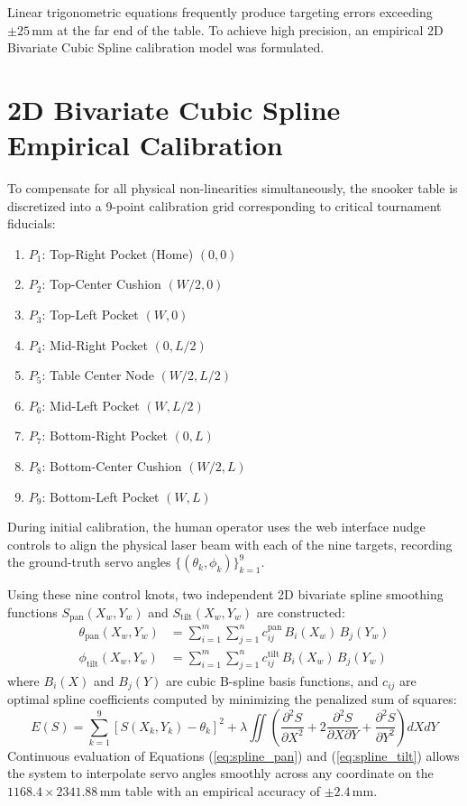 Linear trigonometric equations frequently produce targeting errors exceeding $\pm 25\,\text{mm}$ at the far end of the table. To achieve high precision, an empirical 2D Bivariate Cubic Spline calibration model was formulated.

\section{2D Bivariate Cubic Spline Empirical Calibration}
To compensate for all physical non-linearities simultaneously, the snooker table is discretized into a 9-point calibration grid corresponding to critical tournament fiducials:
\begin{enumerate}
    \item $P_1$: Top-Right Pocket (Home) $(0, 0)$
    \item $P_2$: Top-Center Cushion $(W/2, 0)$
    \item $P_3$: Top-Left Pocket $(W, 0)$
    \item $P_4$: Mid-Right Pocket $(0, L/2)$
    \item $P_5$: Table Center Node $(W/2, L/2)$
    \item $P_6$: Mid-Left Pocket $(W, L/2)$
    \item $P_7$: Bottom-Right Pocket $(0, L)$
    \item $P_8$: Bottom-Center Cushion $(W/2, L)$
    \item $P_9$: Bottom-Left Pocket $(W, L)$
\end{enumerate}

During initial calibration, the human operator uses the web interface nudge controls to align the physical laser beam with each of the nine targets, recording the ground-truth servo angles $\{ (\theta_k, \phi_k) \}_{k=1}^9$. 

Using these nine control knots, two independent 2D bivariate spline smoothing functions $S_{\text{pan}}(X_w, Y_w)$ and $S_{\text{tilt}}(X_w, Y_w)$ are constructed:
\begin{align}
    \theta_{\text{pan}}(X_w, Y_w) &= \sum_{i=1}^m \sum_{j=1}^n c_{ij}^{\text{pan}} \, B_i(X_w) \, B_j(Y_w) \label{eq:spline_pan} \\
    \phi_{\text{tilt}}(X_w, Y_w) &= \sum_{i=1}^m \sum_{j=1}^n c_{ij}^{\text{tilt}} \, B_i(X_w) \, B_j(Y_w) \label{eq:spline_tilt}
\end{align}
where $B_i(X)$ and $B_j(Y)$ are cubic B-spline basis functions, and $c_{ij}$ are optimal spline coefficients computed by minimizing the penalized sum of squares:
\begin{equation}
    E(S) = \sum_{k=1}^9 \left[ S(X_k, Y_k) - \theta_k \right]^2 + \lambda \iint \left( \frac{\partial^2 S}{\partial X^2} + 2 \frac{\partial^2 S}{\partial X \partial Y} + \frac{\partial^2 S}{\partial Y^2} \right) dX dY
\end{equation}
Continuous evaluation of Equations (\ref{eq:spline_pan}) and (\ref{eq:spline_tilt}) allows the system to interpolate servo angles smoothly across any coordinate on the $1168.4 \times 2341.88\,\text{mm}$ table with an empirical accuracy of $\pm 2.4\,\text{mm}$.

